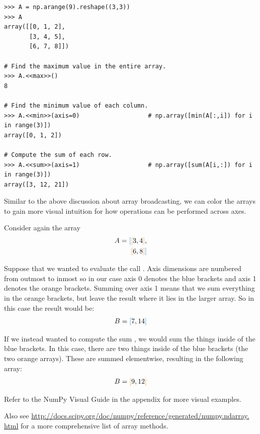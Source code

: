 \begin{lstlisting}
>>> A = np.arange(9).reshape((3,3))
>>> A
array([[0, 1, 2],
       [3, 4, 5],
       [6, 7, 8]])

# Find the maximum value in the entire array.
>>> A.<<max>>()
8

# Find the minimum value of each column.
>>> A.<<min>>(axis=0)                   # np.array([min(A[:,i]) for i in range(3)])
array([0, 1, 2])

# Compute the sum of each row.
>>> A.<<sum>>(axis=1)                   # np.array([sum(A[i,:]) for i in range(3)])
array([3, 12, 21])
\end{lstlisting}

Similar to the above discussion about array broadcasting, we can color the arrays to gain more visual intuition for how operations can be performed across axes. 

Consider again the array
\begin{align*}
A = \textcolor{blue}{[} \textcolor{orange}{[} 3, 4 \textcolor{orange}{]}, \\
\textcolor{orange}{[} 6, 8 \textcolor{orange}{]} \textcolor{blue}{]}
\end{align*}

Suppose that we wanted to evaluate the call . 
Axis dimensions are numbered from outmost to inmost so in our case axis 0 denotes the blue brackets and axis 1 denotes the orange brackets.
Summing over axis 1 means that we sum everything in the orange brackets, but leave the result where it lies in the larger array.
So in this case the result would be:
\begin{align*}
B = \textcolor{blue}{[} 7, 14 \textcolor{blue}{]}
\end{align*}

If we instead wanted to compute the sum  , we would sum the things inside of the blue brackets. 
In this case, there are two things inside of the blue brackets (the two orange arrays). 
These are summed elementwise, resulting in the following array:
\begin{align*}
B = \textcolor{orange}{[} 9, 12 \textcolor{orange}{]}
\end{align*}


Refer to the NumPy Visual Guide in the appendix for more visual examples.

Also see \url{http://docs.scipy.org/doc/numpy/reference/generated/numpy.ndarray.
html} for a more comprehensive list of array methods.


